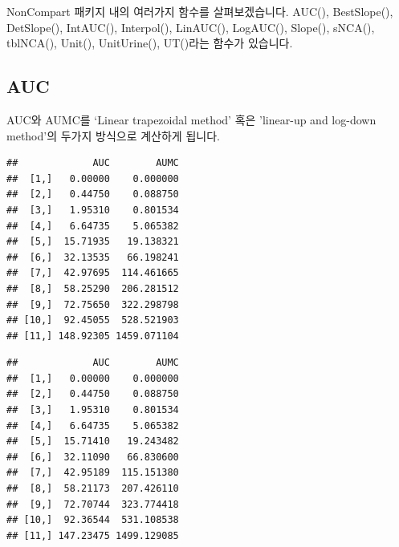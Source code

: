 \documentclass[
  12pt,
]{krantz}
\newenvironment{Shaded}{\begin{snugshade}}{\end{snugshade}}
\newcommand{\DataTypeTok}[1]{\textcolor[rgb]{0.13,0.29,0.53}{#1}}
\newcommand{\DecValTok}[1]{\textcolor[rgb]{0.00,0.00,0.81}{#1}}
\newcommand{\KeywordTok}[1]{\textcolor[rgb]{0.13,0.29,0.53}{\textbf{#1}}}
\newcommand{\NormalTok}[1]{#1}
\newcommand{\OperatorTok}[1]{\textcolor[rgb]{0.81,0.36,0.00}{\textbf{#1}}}
\newcommand{\StringTok}[1]{\textcolor[rgb]{0.31,0.60,0.02}{#1}}
\begin{document}
NonCompart 패키지 내의 여러가지 함수를 살펴보겠습니다. AUC(), BestSlope(), DetSlope(), IntAUC(), Interpol(), LinAUC(), LogAUC(), Slope(), sNCA(), tblNCA(), Unit(), UnitUrine(), UT()라는 함수가 있습니다.

\hypertarget{auc}{%
\subsection{AUC}\label{auc}}

AUC와 AUMC를 `Linear trapezoidal method' 혹은 'linear-up and log-down method'의 두가지 방식으로 계산하게 됩니다.

\begin{Shaded}
\end{Shaded}

\begin{verbatim}
##             AUC        AUMC
##  [1,]   0.00000    0.000000
##  [2,]   0.44750    0.088750
##  [3,]   1.95310    0.801534
##  [4,]   6.64735    5.065382
##  [5,]  15.71935   19.138321
##  [6,]  32.13535   66.198241
##  [7,]  42.97695  114.461665
##  [8,]  58.25290  206.281512
##  [9,]  72.75650  322.298798
## [10,]  92.45055  528.521903
## [11,] 148.92305 1459.071104
\end{verbatim}

\begin{Shaded}
\end{Shaded}

\begin{verbatim}
##             AUC        AUMC
##  [1,]   0.00000    0.000000
##  [2,]   0.44750    0.088750
##  [3,]   1.95310    0.801534
##  [4,]   6.64735    5.065382
##  [5,]  15.71410   19.243482
##  [6,]  32.11090   66.830600
##  [7,]  42.95189  115.151380
##  [8,]  58.21173  207.426110
##  [9,]  72.70744  323.774418
## [10,]  92.36544  531.108538
## [11,] 147.23475 1499.129085
\end{verbatim}
\end{document}
